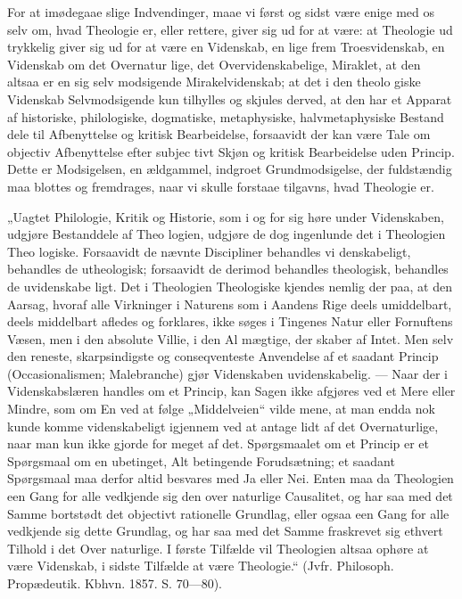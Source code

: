 \documentclass[12pt]{book}
\newcommand{\opage}[1]{\marginnote{\footnotesize\textit{[#1]}}}
\begin{document}
For at imødegaae slige Indvendinger, maae vi først
og sidst være enige med os selv om, hvad Theologie er,
eller rettere, giver sig ud for at være: at Theologie ud\-%
trykkelig giver sig ud for at være en Videnskab, en lige\-%
frem Troesvidenskab, en Videnskab om det Overnatur\-%
lige, det Overvidenskabelige, Miraklet, at den altsaa er en
sig selv modsigende Mirakelvidenskab; at det i den theolo\-%
giske Videnskab Selvmodsigende kun tilhylles og skjules
derved, at den har et Apparat af historiske, philologiske,
dogmatiske, metaphysiske, halvmetaphysiske Bestand\-%
dele til Afbenyttelse og kritisk Bearbeidelse, forsaavidt
der kan være Tale om objectiv Afbenyttelse efter subjec\-%
tivt Skjøn og kritisk Bearbeidelse uden Princip. Dette
er Modsigelsen, en ældgammel, indgroet Grundmodsigelse,
der fuldstændig maa blottes og fremdrages, naar vi skulle
forstaae tilgavns, hvad Theologie er.

„Uagtet Philologie, Kritik og Historie, som i og for
sig høre under Videnskaben, udgjøre Bestanddele af Theo\-%
logien, udgjøre de dog ingenlunde det i Theologien Theo\-%
logiske. Forsaavidt de nævnte Discipliner behandles vi\-%
denskabeligt, behandles de utheologisk; forsaavidt de
derimod behandles theologisk, behandles de uvidenskabe\-%
ligt. Det i Theologien Theologiske kjendes nemlig der\-%
paa, at den Aarsag, hvoraf alle Virkninger i Naturens
som i Aandens Rige deels umiddelbart, deels middelbart
afledes og forklares, ikke søges i Tingenes Natur eller
Fornuftens Væsen, men i den absolute Villie, i den Al\-%
mægtige, der skaber af Intet. Men selv den reneste,
skarpsindigste og conseqventeste Anvendelse af et saadant
\opage{275}\setcounter{footnote}{0}%
Princip (Occasionalismen; Malebranche) gjør Videnskaben
uvidenskabelig. --- Naar der i Videnskabslæren handles
om et Princip, kan Sagen ikke afgjøres ved et Mere eller
Mindre, som om En ved at følge „Middelveien“ vilde
mene, at man endda nok kunde komme videnskabeligt
igjennem ved at antage lidt af det Overnaturlige, naar
man kun ikke gjorde for meget af det. Spørgsmaalet
om et Princip er et Spørgsmaal om en ubetinget, Alt
betingende Forudsætning; et saadant Spørgsmaal maa
derfor altid besvares med Ja eller Nei. Enten maa da
Theologien een Gang for alle vedkjende sig den over\-%
naturlige Causalitet, og har saa med det Samme bortstødt
det objectivt rationelle Grundlag, eller ogsaa een Gang
for alle vedkjende sig dette Grundlag, og har saa med
det Samme fraskrevet sig ethvert Tilhold i det Over\-%
naturlige. I første Tilfælde vil Theologien altsaa ophøre
at være Videnskab, i sidste Tilfælde at være Theologie.“
(Jvfr. Philosoph. Propædeutik. Kbhvn. 1857. S. 70---80).
\end{document}
